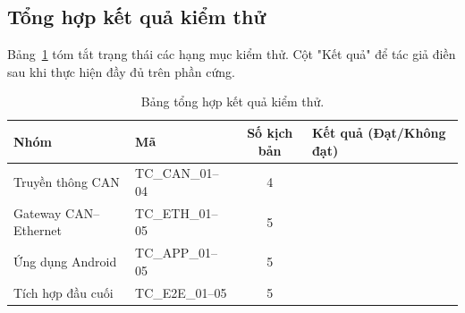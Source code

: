 \documentclass[../DoAn.tex]{subfiles}
\begin{document}
\subsection{Tổng hợp kết quả kiểm thử}
\label{section:4.4.5}

Bảng~\ref{tab:test-summary} tóm tắt trạng thái các hạng mục kiểm thử. Cột "Kết
quả" để tác giả điền sau khi thực hiện đầy đủ trên phần cứng.

\begin{table}[H]
  \centering
  \caption{Bảng tổng hợp kết quả kiểm thử.}
  \label{tab:test-summary}
  \begin{tabular}{@{}llcp{4.6cm}@{}}
    \toprule
    \textbf{Nhóm} & \textbf{Mã} & \textbf{Số kịch bản} & \textbf{Kết quả (Đạt/Không đạt)} \\
    \midrule
    Truyền thông CAN & TC\_CAN\_01--04 & 4 & %
    \\
    Gateway CAN--Ethernet & TC\_ETH\_01--05 & 5 & %
    \\
    Ứng dụng Android & TC\_APP\_01--05 & 5 & %
    \\
    Tích hợp đầu cuối & TC\_E2E\_01--05 & 5 & %
    \\
    \bottomrule
  \end{tabular}
\end{table}
\end{document}
